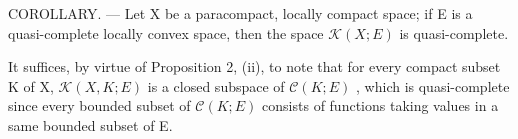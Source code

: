 COROLLARY. --- Let X be a paracompact, locally compact space; if E is a quasi-complete locally convex space, then the space \(\mathcal{K}(X;E)\) is quasi-complete.

It suffices, by virtue of Proposition 2, (ii), to note that for every compact subset K of X, \(\mathcal{K}(X,K;E)\) is a closed subspace of \(\mathcal{C}(K;E)\) , which is quasi-complete since every bounded subset of \(\mathcal{C}(K;E)\) consists of functions taking values in a same bounded subset of E.

